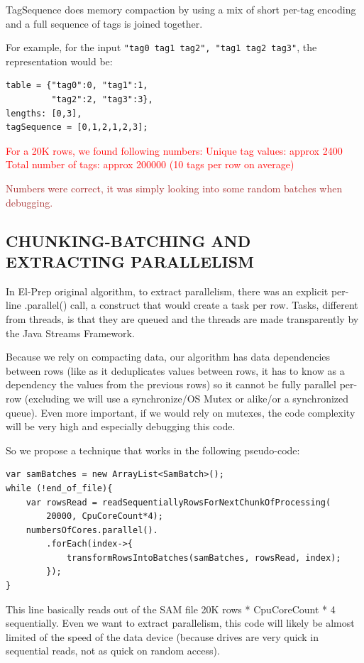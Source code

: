 \documentclass[a4paper,twoside]{article}
\begin{document}
TagSequence does memory compaction by using a mix of short per-tag encoding and a full sequence of tags is joined together.

For example, for the input {\tt "tag0 tag1 tag2", "tag1 tag2 tag3"}, the representation would be:
\begin{verbatim}
table = {"tag0":0, "tag1":1, 
         "tag2":2, "tag3":3},
lengths: [0,3], 
tagSequence = [0,1,2,1,2,3]; 
\end{verbatim}

\textcolor{red}{
For a 20K rows, we found following numbers:
Unique tag values: approx 2400
Total number of tags: approx 200000 (10 tags per row on average)
}

\textcolor{brown}{ Numbers were correct, it was simply looking into some random batches when debugging.
}



\subsection{\uppercase{Chunking-Batching and Extracting Parallelism}}
In El-Prep original algorithm, to extract parallelism, there was an explicit per-line .parallel() call, a construct that would create a task per row. Tasks, different from threads, is that they are queued and the threads are made transparently by the Java Streams Framework.

Because we rely on compacting data, our algorithm has data dependencies between rows (like as it deduplicates values between rows, it has to know as a dependency the values from the previous rows) so it cannot be fully parallel per-row (excluding we will use a synchronize/OS Mutex or alike/or a synchronized queue). Even more important, if we would rely on mutexes, the code complexity will be very high and especially debugging this code.

So we propose a technique that works in the following pseudo-code:

\begin{verbatim}
var samBatches = new ArrayList<SamBatch>();
while (!end_of_file){
	var rowsRead = readSequentiallyRowsForNextChunkOfProcessing(
		20000, CpuCoreCount*4);
	numbersOfCores.parallel().
		.forEach(index->{
			transformRowsIntoBatches(samBatches, rowsRead, index);
		});
}
\end{verbatim}

This line basically reads out of the SAM file 20K rows * CpuCoreCount * 4 sequentially. Even we want to extract parallelism, this code will likely be almost limited of the speed of the data device (because drives are very quick in sequential reads, not as quick on random access).
\end{document}
